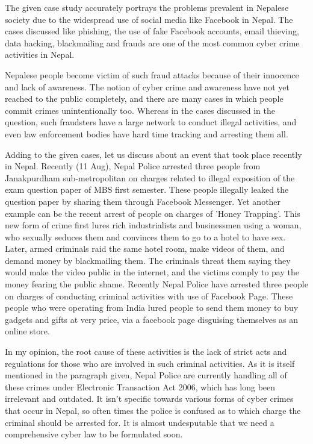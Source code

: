 \documentclass [12pt, a4paper]{article}
\begin{document}
\normalsize
The given case study accurately portrays the problems prevalent in Nepalese society due to the widespread use of social media like Facebook in Nepal. The cases discussed like phishing, the use of fake Facebook accounts, email thieving, data hacking, blackmailing and frauds are one of the most common cyber crime activities in Nepal.\\
\par
Nepalese people become victim of such fraud attacks because of their innocence and lack of awareness. The notion of cyber crime and awareness have not yet reached to the public completely, and there are many cases in which people commit crimes unintentionally too. Whereas in the cases discussed in the question, such fraudsters have a large network to conduct illegal activities, and even law enforcement bodies have hard time tracking and arresting them all.\\
\par
Adding to the given cases, let us discuss about an event that took place recently in Nepal. Recently (11 Aug), Nepal Police arrested three people from Janakpurdham sub-metropolitan on charges related to illegal exposition of the exam question paper of MBS first semester. These people illegally leaked the question paper by sharing them through Facebook Messenger. Yet another example can be the recent arrest of people on charges of 'Honey Trapping'. This new form of crime first lures rich industrialists and businessmen using a woman, who sexually seduces them and convinces them to go to a hotel to have sex. Later, armed criminals raid the same hotel room, make videos of them, and demand money by blackmailing them. The criminals threat them saying they would make the video public in the internet, and the victims comply to pay the money fearing the public shame. Recently Nepal Police have arrested three people on charges of conducting criminal activities with use of Facebook Page. These people who were operating from India lured people to send them money to buy gadgets and gifts at very price, via a facebook page disguising themselves as an online store. \\
\par
In my opinion, the root cause of these activities is the lack of strict acts and regulations for those who are involved in such criminal activities. As it is itself mentioned in the paragraph given, Nepal Police are currently handling all of these crimes under Electronic Transaction Act 2006, which has long been irrelevant and outdated. It isn't specific towards various forms of cyber crimes that occur in Nepal, so often times the police is confused as to which charge the criminal should be arrested for. It is almost undesputable that we need a comprehensive cyber law to be formulated soon. \\
\end{document}
